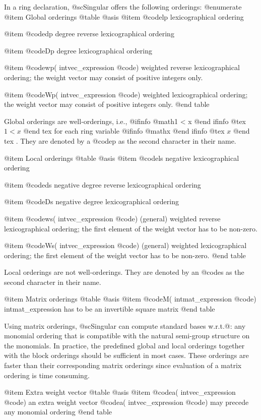 In a ring declaration, @sc{Singular} offers the following orderings:
@enumerate
@item Global orderings
@table @asis
@item @code{lp}
lexicographical ordering

@item @code{dp}
degree reverse lexicographical ordering

@item @code{Dp}
degree lexicographical ordering

@item @code{wp(} intvec_expression @code{)}
weighted reverse lexicographical ordering; the weight vector may
consist of positive integers only.

@item @code{Wp(} intvec_expression @code{)}
weighted lexicographical ordering; the weight vector may consist of
positive integers only.
@end table

Global orderings are well-orderings, i.e., 
@ifinfo
@math{1 < x}
@end ifinfo
@tex
$1 < x$
@end tex
 for each ring
variable 
@ifinfo
@math{x}
@end ifinfo
@tex
$x$
@end tex
. They are denoted by a @code{p} as the second
character in their name.

@item Local orderings
@table @asis
@item @code{ls}
negative lexicographical ordering

@item @code{ds}
negative degree reverse lexicographical ordering

@item @code{Ds}
negative degree lexicographical ordering

@item @code{ws(} intvec_expression @code{)}
(general) weighted reverse lexicographical ordering; the first element
of the weight vector has to be non-zero.

@item @code{Ws(} intvec_expression @code{)}
(general) weighted lexicographical ordering; the first element
of the weight vector has to be non-zero.
@end table

Local orderings are not well-orderings. They are denoted by an @code{s}
as the second character in their name.

@item Matrix orderings
@table @asis
@item @code{M(} intmat_expression @code{)}
intmat_expression has to be an invertible square matrix
@end table

Using matrix orderings, @sc{Singular} can compute standard bases
w.r.t.@: any monomial ordering that is compatible with the natural
semi-group structure on the monomials. In practice, the predefined global
and local orderings together with the block orderings should be
sufficient in most cases. These orderings are faster than their
corresponding matrix orderings since evaluation of a matrix ordering is
time consuming.

@item Extra weight vector
@table @asis
@item @code{a(} intvec_expression @code{)}
an extra weight vector @code{a(} intvec_expression @code{)} may precede
any monomial ordering
@end table

